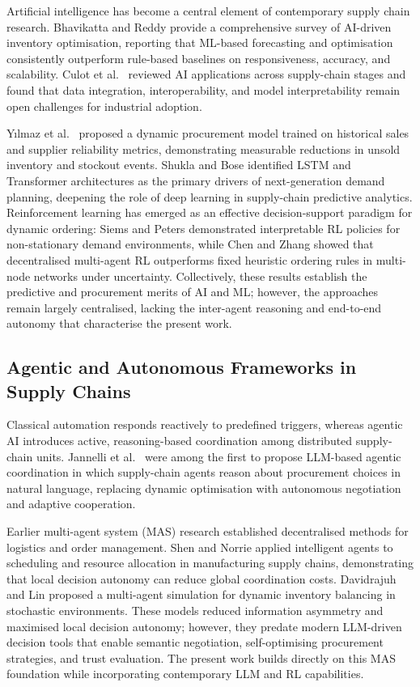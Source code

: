 \documentclass[utf8]{FrontiersinHarvard}
\begin{document}
	Artificial intelligence has become a central element of contemporary supply
	chain research.  Bhavikatta and Reddy \cite{bhavikatta2024survey} provide
	a comprehensive survey of AI-driven inventory optimisation, reporting that
	ML-based forecasting and optimisation consistently outperform rule-based
	baselines on responsiveness, accuracy, and scalability.  Culot et al.\
	\cite{culot2024ai} reviewed AI applications across supply-chain stages and
	found that data integration, interoperability, and model interpretability
	remain open challenges for industrial adoption.

	Yılmaz et al.\ \cite{yilmaz2024aiinventory} proposed a dynamic
	procurement model trained on historical sales and supplier reliability
	metrics, demonstrating measurable reductions in unsold inventory and
	stockout events.  Shukla and Bose \cite{shukla2023review} identified
	LSTM and Transformer architectures as the primary drivers of next-generation
	demand planning, deepening the role of deep learning in supply-chain
	predictive analytics.  Reinforcement learning has emerged as an effective
	decision-support paradigm for dynamic ordering: Siems and Peters
	\cite{siems2023interpretable} demonstrated interpretable RL policies for
	non-stationary demand environments, while Chen and Zhang
	\cite{chen2020multiproduct} showed that decentralised multi-agent RL
	outperforms fixed heuristic ordering rules in multi-node networks under
	uncertainty.  Collectively, these results establish the predictive and
	procurement merits of AI and ML; however, the approaches remain largely
	centralised, lacking the inter-agent reasoning and end-to-end autonomy
	that characterise the present work.

	\subsection{Agentic and Autonomous Frameworks in Supply Chains}

	Classical automation responds reactively to predefined triggers, whereas
	agentic AI introduces active, reasoning-based coordination among distributed
	supply-chain units.  Jannelli et al.\ \cite{jannelli2024agentic} were
	among the first to propose LLM-based agentic coordination in which
	supply-chain agents reason about procurement choices in natural language,
	replacing dynamic optimisation with autonomous negotiation and adaptive
	cooperation.

	Earlier multi-agent system (MAS) research established decentralised methods
	for logistics and order management.  Shen and Norrie
	\cite{shen1999multiagent} applied intelligent agents to scheduling and
	resource allocation in manufacturing supply chains, demonstrating that
	local decision autonomy can reduce global coordination costs.  Davidrajuh
	and Lin \cite{davidrajuh2018multiagent} proposed a multi-agent simulation
	for dynamic inventory balancing in stochastic environments.  These models
	reduced information asymmetry and maximised local decision autonomy;
	however, they predate modern LLM-driven decision tools that enable semantic
	negotiation, self-optimising procurement strategies, and trust evaluation.
	The present work builds directly on this MAS foundation while incorporating
	contemporary LLM and RL capabilities.
\end{document}
